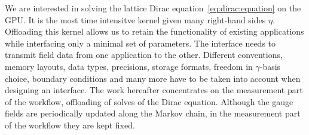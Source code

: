 
We are interested in solving the lattice Dirac equation~\cref{eq:dirac:equation} on the GPU.
It is the most time intensitve kernel given many right-hand sides $\eta$.
Offloading this kernel allows us to retain the functionality of existing applications while interfacing only a minimal set of parameters.
The interface needs to transmit field data from one application to the other.
Different conventions, memory layouts, data types, precisions, storage formats, freedom in $\gamma$-basis choice, boundary conditions and many more have to be taken into account when designing an interface.
The work hereafter concentrates on the measurement part of the workflow, \ie offloading of solves of the Dirac equation.
Although the gauge fields are periodically updated along the Markov chain, in the measurement part of the workflow they are kept fixed.




